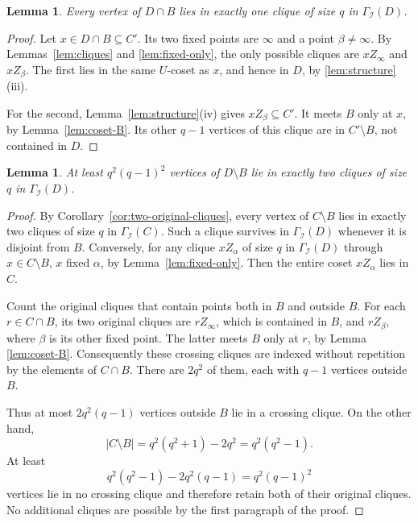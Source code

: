 \documentclass[11pt]{amsart}
\numberwithin{equation}{section}
\newtheorem{lemma}[theorem]{Lemma}
\theoremstyle{definition}
\theoremstyle{remark}
\newcommand{\I}{\mathcal I}
\begin{document}
\begin{lemma}\label{lem:one-clique}
Every vertex of $D\cap B$ lies in exactly one clique of size $q$
in $\Gamma_{\I}(D)$.
\end{lemma}
\begin{proof}
Let $x\in D\cap B \subseteq C'$. 
Its two fixed points are $\infty$ and a point $\beta\ne\infty$. 
By Lemmas~\ref{lem:cliques} and \ref{lem:fixed-only}, the only possible cliques are $xZ_\infty$ and $xZ_\beta$. 
The first lies in the same $U$-coset as $x$, and hence in $D$, by \ref{lem:structure}(iii).

For the second, Lemma~\ref{lem:structure}(iv) gives $xZ_\beta\subseteq C'$. 
It meets $B$ only at $x$, by Lemma~\ref{lem:coset-B}. 
Its other $q-1$ vertices of this clique are in $C'\setminus B$, not contained in $D$.
\end{proof}

\begin{lemma}\label{lem:two-cliques}
At least $q^2(q-1)^2$ vertices of $D\setminus B$ lie in exactly two cliques of size $q$ in $\Gamma_{\I}(D)$.
\end{lemma}
\begin{proof}
By Corollary~\ref{cor:two-original-cliques}, every vertex of $C\setminus B$ lies in exactly two cliques of size $q$ in $\Gamma_{\I}(C)$. 
Such a clique survives in $\Gamma_{\I}(D)$ whenever it is disjoint from $B$. 
Conversely, for any clique $xZ_{\alpha}$ of size $q$ in $\Gamma_{\I}(D)$ through $x\in C\setminus B$, $x$ fixed $\alpha$, by Lemma~\ref{lem:fixed-only}. 
Then the entire coset $xZ_{\alpha}$ lies in $C$.

Count the original cliques that contain points both in $B$ and outside $B$. 
For each $r\in C\cap B$, its two original cliques are $rZ_\infty$, which is contained in $B$, and $rZ_\beta$, where $\beta$ is its other fixed point. 
The latter meets $B$ only at $r$, by Lemma \ref{lem:coset-B}. 
Consequently these crossing cliques are indexed without repetition by the elements of $C\cap B$. 
There are $2q^2$ of them, each with $q-1$ vertices outside $B$.

Thus at most $2q^2(q-1)$ vertices outside $B$ lie in a crossing clique. On the other hand,
\[
 |C\setminus B|=q^2(q^2+1)-2q^2=q^2(q^2-1).
\]
At least
\[
 q^2(q^2-1)-2q^2(q-1)=q^2(q-1)^2
\]
vertices lie in no crossing clique and therefore retain both of their original cliques. No additional cliques are possible by the first paragraph of the proof.
\end{proof}
\end{document}
